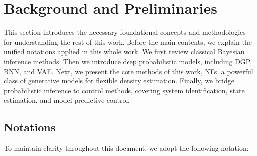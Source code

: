 \section{Background and Preliminaries} 
\label{sec:introduction:background}
This section introduces the necessary foundational concepts and methodologies for understanding the rest of this work. Before the main contents, we explain the unified notations applied in this whole work. We first review classical Bayesian inference methods. Then we introduce deep probabilistic models, including \acf{DGP}, \acf{BNN}, and \acf{VAE}. Next, we present the core methods of this work, \acfp{NF}, a powerful class of generative models for flexible density estimation. Finally, we bridge probabilistic inference to control methods, covering system identification, state estimation, and model predictive control.

\subsection{Notations}

To maintain clarity throughout this document, we adopt the following notation:

